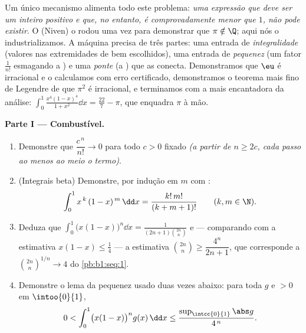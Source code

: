\begin{problem}
\label{pb:b1:integration:1}
Um único mecanismo alimenta todo este problema: \emph{uma expressão que
deve ser um inteiro positivo e que, no entanto, é comprovadamente menor
que $1$, não pode existir}. O  (Niven) o rodou uma vez para
demonstrar que $\pi \notin \Q$; aqui nós o industrializamos. A máquina
precisa de três partes: uma entrada de \emph{integralidade} (valores nas
extremidades de  bem escolhidos), uma entrada de
\emph{pequenez} (um fator $\frac{1}{n!}$ esmagando a ) e uma
\emph{ponte} (a ) que as conecta. Demonstramos que
$\eu$ é irracional e o calculamos com erro certificado, demonstramos o
teorema mais fino de Legendre de que $\pi^2$ é irracional, e terminamos
com a  mais encantadora da análise: $\int_0^1 \frac{x^4(1 -
x)^4}{1 + x^2}\dd x = \frac{22}{7} - \pi$, que enquadra $\pi$
à mão.

\medskip
\noindent\textbf{Parte I --- Combustível.}
\begin{enumerate}
  \item Demonstre que $\dfrac{c^{\,n}}{n!} \to 0$ para todo $c
        > 0$ fixado \emph{(a partir de $n \geq 2c$, cada passo  ao
        menos ao meio o termo)}.
  \item (Integrais beta) Demonstre, por indução em $m$ com
        :
        \[
        \int_0^1 x^{\,k}\,(1 - x)^{\,m}\,\dd x =
        \frac{k!\,m!}{(k + m + 1)!}
        \qquad (k, m \in \N).
        \]
  \item Deduza que $\displaystyle\int_0^1 \bigl(x(1-x)\bigr)^n \dd x
        = \frac{1}{(2n+1)\binom{2n}{n}}$ e --- comparando com
        a estimativa $x(1 - x) \leq \frac14$ --- a estimativa
        $\binom{2n}{n} \geq \dfrac{4^n}{2n+1}$, que corresponde a
        $\binom{2n}{n}^{1/n} \to 4$ do \cref{pb:b1:seq:1}.
  \item Demonstre o lema da pequenez usado duas vezes abaixo: para toda
        $g$  e $> 0$ em $\intoo{0}{1}$,
        \[
        0 < \int_0^1 \bigl(x(1-x)\bigr)^n g(x)\,\dd x
        \leq \frac{\sup_{\intcc{0}{1}}\abs g}{4^{\,n}} .
        \]
\end{enumerate}


\end{problem}

